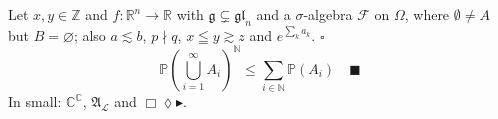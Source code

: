 \documentclass[11pt]{article}
\begin{document}
Let $x,y\in\mathbb{Z}$ and $f\colon\mathbb{R}^n\to\mathbb{R}$ with $\mathfrak{g}\subsetneq\mathfrak{gl}_n$ and a
$\sigma$-algebra $\mathscr{F}$ on $\Omega$, where $\emptyset\neq A$ but $B=\varnothing$; also $a\lesssim b$, $p\nmid q$,
$x\leqq y\gtrsim z$ and $e^{\sum_{k} a_k}$. \hfill $\square$
\[ \mathbb{P}\left(\bigcup_{i=1}^{\infty} A_i\right)^{\mathbb{N}} \leqslant \sum_{i\in\mathbb{N}} \mathbb{P}(A_i) \quad \blacksquare \]
{\small In small: $\mathbb{C}^{\mathbb{C}}$, $\mathfrak{A}_{\mathscr{L}}$ and $\Box\lozenge\blacktriangleright$.}
\end{document}
